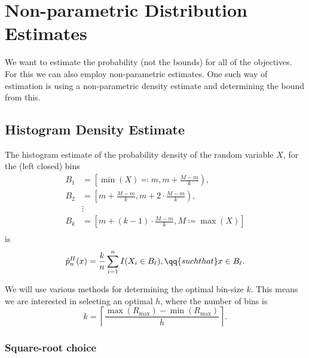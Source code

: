\begin{table}[h!]
    \centering
    
    \caption{Summary of the distribution free estimates for the objectives}
    \label{tab:dist_free_summary}
\end{table}


\section{Non-parametric Distribution Estimates}%
\label{sec:non-parametric_estimates}

We want to estimate the probability (not the bounds) for all of the objectives. For this we can also employ
non-parametric estimates. One such way of estimation is using a non-parametric density estimate and determining the bound
from this.

\subsection{Histogram Density Estimate}%
\label{sub:histogram_density_estimate}

The histogram estimate of the probability density of the random variable \(X\), for the (left closed) bins \[
    \begin{split}
        B_1 &= \left[\min(X)\eqqcolon m, m + \frac{M - m}{k}\right),\\
        B_2 &= \left[m + \frac{ M - m }{k}, m + 2\cdot\frac{M - m}{k}\right),\\
            &\vdots\\
        B_k &= \left[m + (k-1)\cdot\frac{M - m}{k}, M \coloneqq \max(X)\right]\\
    \end{split}
\]  is \begin{equation}
    \label{eq:histogram_density_estimate}
    \hat{p}_n^{H}(x) = \frac{k}{n}\sum_{i = 1}^{n} I(X_i \in B_\ell), \qq{such that} x \in B_\ell.
\end{equation}

We will use various methods for determining the optimal bin-size \(k\).
This means we are interested in selecting an optimal \(h\), where the number of bins is \[
    k = \left\lceil \frac{\max(R_{\max}) - \min(R_{\max})}{h} \right\rceil.
\] 

\subsubsection{Square-root choice}%
\label{ssub:square-root_choice}

